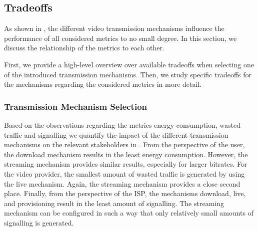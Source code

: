 \subsection{Tradeoffs}\label{sec:application:lte_video:trade_offs}
As shown in , the different video transmission mechanisms influence the performance of all considered metrics to no small degree. 
In this section, we discuss the relationship of the metrics to each other.

First, we provide a high-level overview over available tradeoffs when selecting one of the introduced transmission mechanisms.
Then, we study specific tradeoffs for the \streaming mechanisms regarding the considered metrics in more detail.

\subsubsection*{Transmission Mechanism Selection}\label{sec:application:lte_video:trade_offs:mechanism_selection}

Based on the observations regarding the metrics energy consumption, wasted traffic and signalling we quantify the impact of the different transmission mechanisms on the relevant stakeholders in .
From the perspective of the user, the download mechanism results in the least energy consumption.
However, the streaming mechanism provides similar results, especially for larger bitrates.
For the video provider, the smallest amount of wasted traffic is generated by using the live mechanism.
Again, the streaming mechanism provides a close second place.
Finally, from the perspective of the \gls{ISP}, the mechanisms download, live, and provisioning result in the least amount of signalling.
The streaming mechanism can be configured in such a way that only relatively small amounts of signalling is generated.

